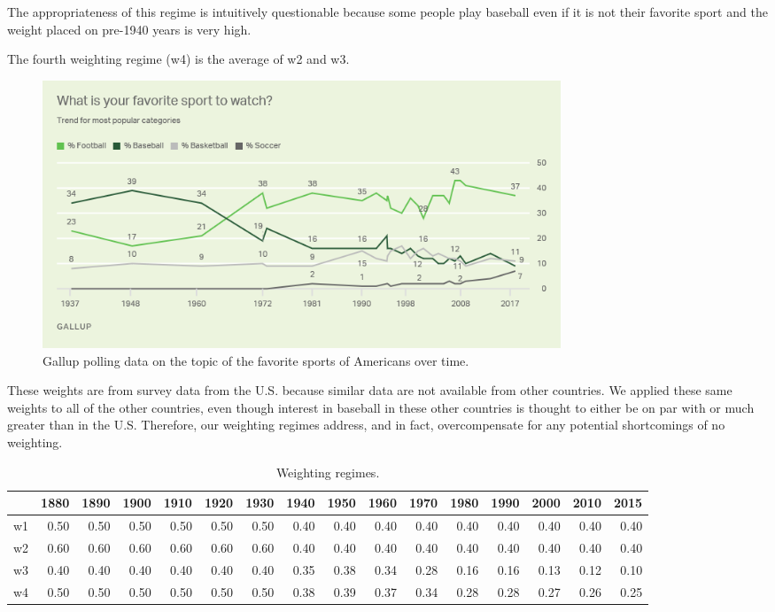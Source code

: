 \documentclass[11pt]{article}\usepackage[]{graphicx}\usepackage[]{color}
\begin{document}
The appropriateness of this regime is intuitively questionable because 
some people play baseball even if it is not their favorite sport and the 
weight placed on pre-1940 years is very high.  

The fourth weighting regime (w4) is the average of w2 and w3.  



\begin{figure}
\begin{center}
\includegraphics[width=0.75\textwidth]{Gallupfavoritesport.png}
\end{center}
\caption{Gallup polling data on the topic of the favorite sports 
  of Americans over time.}
\label{Gallup}
\end{figure}


These weights are from survey data from the U.S. because similar data are 
not available from other countries. We applied these same weights to all 
of the other countries, even though interest in baseball in these other 
countries is thought to either be on par with or much greater than in 
the U.S. Therefore, our weighting regimes address, and in fact, 
overcompensate for any potential shortcomings of no weighting.







\begin{table}[ht]
\centering
\begingroup\footnotesize
\begin{tabular}{rrrrrrrrrrrrrrrr}
  \hline
 & 1880 & 1890 & 1900 & 1910 & 1920 & 1930 & 1940 & 1950 & 1960 & 1970 & 1980 & 1990 & 2000 & 2010 & 2015 \\ 
  \hline
w1 & 0.50 & 0.50 & 0.50 & 0.50 & 0.50 & 0.50 & 0.40 & 0.40 & 0.40 & 0.40 & 0.40 & 0.40 & 0.40 & 0.40 & 0.40 \\ 
  w2 & 0.60 & 0.60 & 0.60 & 0.60 & 0.60 & 0.60 & 0.40 & 0.40 & 0.40 & 0.40 & 0.40 & 0.40 & 0.40 & 0.40 & 0.40 \\ 
  w3 & 0.40 & 0.40 & 0.40 & 0.40 & 0.40 & 0.40 & 0.35 & 0.38 & 0.34 & 0.28 & 0.16 & 0.16 & 0.13 & 0.12 & 0.10 \\ 
  w4 & 0.50 & 0.50 & 0.50 & 0.50 & 0.50 & 0.50 & 0.38 & 0.39 & 0.37 & 0.34 & 0.28 & 0.28 & 0.27 & 0.26 & 0.25 \\ 
   \hline
\end{tabular}
\endgroup
\caption{Weighting regimes.} 
\end{table}
\end{document}
